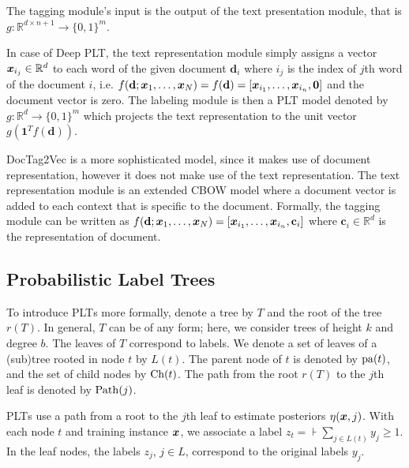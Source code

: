 \documentclass{article}
\newcommand{\bd}{\mathbf{d}}
\newcommand{\bc}{\mathbf{c}}
\newcommand{\Algo}[1]{\textsc{#1}}
\newcommand\R{\mathbb{R}}   %
\newcommand{\sectionBefore}{-0pt}
\newcommand{\sectionAfter}{-0pt}
\begin{document}
The tagging module's input is the output of the text presentation module, that is $g: \R^{d \times n+1} \rightarrow  \{ 0 , 1 \}^m$. 

In case of Deep PLT, the text representation module simply assigns a vector $\bx_{i_j} \in \R^d$ to each word of the given document $\bd_i$ where $i_j$ is the index of $j$\/th word of the document $i$, i.e. $f(\bd; \bx_1, \dots, \bx_N) = f(\bd) = \left[\bx_{i_1}, \dots , \bx_{i_n}, \mathbf{0}\right]$ and the document vector is zero. The labeling module is then a PLT model denoted by $g : \R^d \rightarrow  \{ 0 , 1 \}^m$ which projects the text representation to the unit vector $g( \mathbf{1}^T  f(\bd))$.


DocTag2Vec is a more sophisticated model, since it makes use of document representation, however it does not make use of the text representation. The text representation module is an extended CBOW model where a document vector is added to each context that is specific to the document. Formally, the tagging module can be written as $f(\bd; \bx_1, \dots, \bx_N)=\left[\bx_{i_1}, \dots , \bx_{i_n}, \bc_i \right]$ where $\bc_i \in \R ^d$ is the representation of document. 



\vspace{\sectionBefore}
\subsection{Probabilistic Label Trees}
\vspace{\sectionAfter}

To introduce \Algo{PLT}s more formally, denote a tree by $T$ and the root of the tree $r(T)$. In general, $T$ can be of any form; here, we consider trees of height $k$ and degree $b$. 
The leaves of $T$ correspond to labels. We denote a set of leaves of a (sub)tree rooted in node $t$ by $L(t)$. %
The parent node of $t$ is denoted by $\mathrm{pa}(t)$, and the set of child nodes by $\mathrm{Ch}(t)$. The path from the root $r(T)$ to the $j$\/th leaf is denoted by $\mathrm{Path}(j)$. %

\Algo{PLT}s use a path from a root to the $j$\/th leaf to estimate posteriors $\eta(\boldsymbol{x}, j)$. %
With each node $t$ and training instance $\boldsymbol{x}$, we associate a label $z_t = \assert{\textstyle \sum_{j \in L(t)} y_j \ge 1}$.
In the leaf nodes, the labels $z_j$, $j \in L$, correspond to the original labels $y_j$.
\end{document}
